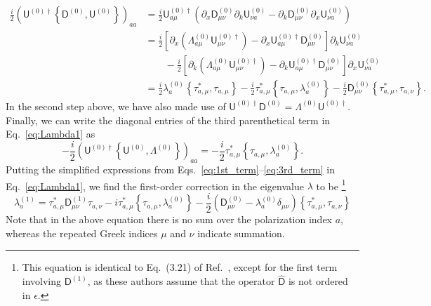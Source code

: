 \begin{equation}
  \begin{aligned}
    \frac{i}{2}\left(\mathsf{U}^{(0)\dagger}  \left\{\mathsf{D}^{(0)}, \mathsf{U}^{(0)}\right\}\right)_{aa} &= \frac{i}{2}\mathsf{U}^{(0)\dagger}_{a\mu}\left(\partial_{x}\mathsf{D}^{(0)}_{\mu\nu}\partial_{k}\mathsf{U}^{(0)}_{\nu a} - \partial_{k}\mathsf{D}^{(0)}_{\mu\nu}\partial_{x}\mathsf{U}_{\nu a}^{(0)}\right)\\
                                                                                                                  &=  \frac{i}{2}\left[\partial_{x}\left(\Lambda^{(0)}_{a\mu}\mathsf{U}^{(0)\dagger}_{\mu\nu}\right) - \partial_{x}\mathsf{U}^{(0)\dagger}_{a\mu}\mathsf{D}^{(0)}_{\mu\nu}\right]\partial_{k}\mathsf{U}_{\nu a}^{(0)}\\
                                                                                                                    &\phantom{}\qquad - \frac{i}{2}\left[\partial_{k}\left(\Lambda^{(0)}_{a\mu}\mathsf{U}^{(0)\dagger}_{\mu\nu}\right) - \partial_{k}\mathsf{U}^{(0)\dagger}_{a\mu}\mathsf{D}^{(0)}_{\mu\nu}\right]\partial_{x}\mathsf{U}_{\nu a}^{(0)}\\
                                                                                                                      &= \frac{i}{2}\lambda^{(0)}_{a}\left\{\tau_{a,\mu}^{*}, \tau_{a,\mu}\right\} - \frac{i}{2}\tau_{a,\mu}^{*}\left\{\tau_{a,\mu},\lambda^{(0)}_{a}\right\} - \frac{i}{2}\mathsf{D}^{(0)}_{\mu\nu}\left\{\tau_{a,\mu}^{*}, \tau_{a,\nu}\right\}.
  \end{aligned}
  \label{eq:2nd_term}
\end{equation}
%
In the second step above, we have also made use of $\mathsf{U}^{(0)\dagger}\mathsf{D}^{(0)} = \Lambda^{(0)}\mathsf{U}^{(0)\dagger}$.
Finally, we can write the diagonal entries of the third parenthetical term in Eq.~\eqref{eq:Lambda1} as
%
\begin{equation}
  -\frac{i}{2}\left(\mathsf{U}^{(0)\dagger}\left\{\mathsf{U}^{(0)}, \Lambda^{(0)}\right\}\right)_{aa} = -\frac{i}{2}\tau_{a,\mu}^{*}\left\{\tau_{a,\mu},\lambda_{a}^{(0)}\right\}.
  \label{eq:3rd_term}
\end{equation}
%
Putting the simplified expressions from Eqs.~\eqref{eq:1st_term}--\eqref{eq:3rd_term} in Eq.~\eqref{eq:Lambda1}, we find the first-order correction in the eigenvalue $\lambda$ to be%
\footnote{This equation is identical to Eq.~(3.21) of Ref.~\cite{littlejohn1991a}, except for the first term involving $\mathsf{D}^{(1)}$, as these authors assume that the operator $\widehat{\mathsf{D}}$ is not ordered in $\epsilon$.}
%
\begin{equation}
  \boxed{
  \lambda^{(1)}_{a} = \tau_{a,\mu}^{*}\mathsf{D}_{\mu\nu}^{(1)}\tau_{a,\nu} - i\tau_{a,\mu}^{*}\left\{\tau_{a,\mu}, \lambda^{(0)}_{a}\right\} - \frac{i}{2}\left(\mathsf{D}^{(0)}_{\mu\nu} - \lambda^{(0)}_{a}\delta_{\mu\nu}\right)\left\{\tau_{a,\mu}^{*}, \tau_{a,\nu}\right\}}
  \label{eq:lambda1}
\end{equation}
%
Note that in the above equation there is no sum over the polarization index $a$, whereas the repeated Greek indices $\mu$ and $\nu$ indicate summation.

